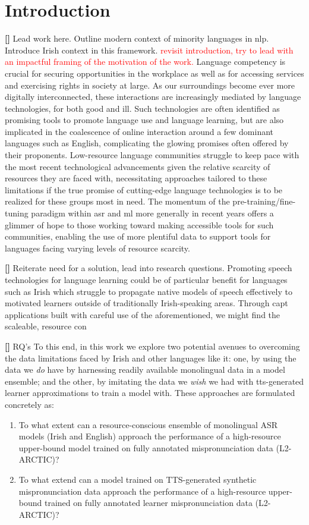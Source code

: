 \documentclass[thesis]{cluu}
\newcounter{paranum}
\newcommand{\numberedparagraph}{\par\refstepcounter{paranum}\textbf{[\theparanum] }}
\newcommand{\todo}[1]{\textcolor{red}{#1}}
\begin{document}
\chapter{Introduction}
\numberedparagraph{Lead work here. Outline modern context of minority languages in nlp. Introduce Irish context in this framework.}
\todo{revisit introduction, try to lead with an impactful framing of the motivation of the work.}
Language competency is crucial for securing opportunities in the workplace as well as for accessing services and exercising rights in society at large. As our surroundings become ever more digitally interconnected, these interactions are increasingly mediated by language technologies, for both good and ill. Such technologies are often identified as promising tools to promote language use and language learning, but are also implicated in the coalescence of online interaction around a few dominant languages such as English, complicating the glowing promises often offered by their proponents. Low-resource language communities struggle to keep pace with the most recent technological advancements given the relative scarcity of resources they are faced with, necessitating approaches tailored to these limitations if the true promise of cutting-edge language technologies is to be realized for these groups most in need. The momentum of the pre-training/fine-tuning paradigm within \gls{asr} and \gls{ml} more generally in recent years offers a glimmer of hope to those working toward making accessible tools for such communities, enabling the use of more plentiful data to support tools for languages facing varying levels of resource scarcity.

\numberedparagraph{Reiterate need for a solution, lead into research questions.} 
Promoting speech technologies for language learning could be of particular benefit for languages such as Irish which struggle to propagate native models of speech effectively to motivated learners outside of traditionally Irish-speaking areas. Through \gls{capt} applications built with careful use of the aforementioned, we might find the scaleable, resource con

\numberedparagraph{RQ's} 
To this end, in this work we explore two potential avenues to overcoming the data limitations faced by Irish and other languages like it: one, by using the data we \textit{do} have by harnessing readily available monolingual data in a model ensemble; and the other, by imitating the data we \textit{wish} we had with \gls{tts}-generated learner approximations to train a model with. These approaches are formulated concretely as:
\begin{enumerate}
  \item To what extent can a resource-conscious ensemble of monolingual ASR models (Irish and English) approach the performance of a high-resource upper-bound model trained on fully annotated mispronunciation data (L2-ARCTIC)?\label{rq:1}
  \item To what extend can a model trained on TTS-generated synthetic mispronunciation data approach the performance of a high-resource upper-bound trained on fully annotated learner mispronunciation data (L2-ARCTIC)?\label{rq:2}
\end{enumerate}
\end{document}
